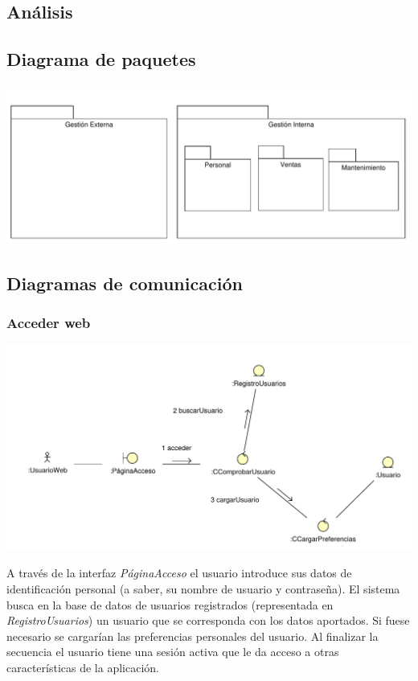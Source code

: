 \documentclass[11pt, a4paper, twoside, titlepage]{article}
\begin{document}
\begin{landscape}
	\section{Análisis}
		\subsection{Diagrama de paquetes}
		\vfill
		\begin{center}
			\hspace*{-.5cm}
			\includegraphics[scale=1]{analisis/diagramas/paquetes.pdf}
		\end{center}
		\vfill
\end{landscape}
		\subsection{Diagramas de comunicación}
			\subsubsection{Acceder web}
				\begin{center}
					\includegraphics[scale=.70]{analisis/diagramas/accederweb.pdf}
				\end{center}

				A través de la interfaz {\itshape PáginaAcceso} el usuario introduce sus datos de identificación personal (a saber, su nombre de usuario y contraseña). El sistema busca en la base de datos de usuarios registrados (representada en {\itshape RegistroUsuarios}) un usuario que se corresponda con los datos aportados. Si fuese necesario se cargarían las preferencias personales del usuario. Al finalizar la secuencia el usuario tiene una sesión activa que le da acceso a otras características de la aplicación.
\end{document}
